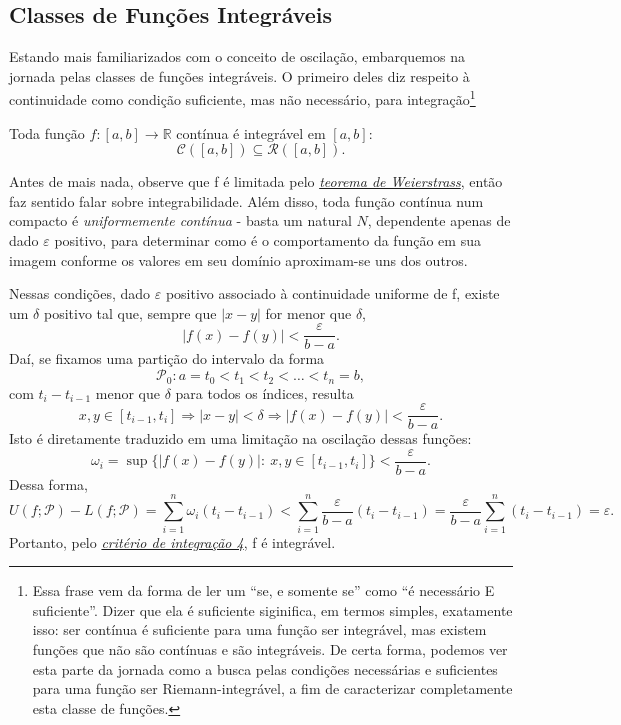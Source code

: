 \documentclass[../analysisII_notes.tex]{subfiles}
\begin{document}
\subsection{Classes de Funções Integráveis}
Estando mais familiarizados com o conceito de oscilação, embarquemos na jornada pelas classes de funções integráveis. O primeiro deles diz respeito à continuidade como condição suficiente, mas não necessário, para integração\footnote{Essa frase vem da forma de ler um ``se, e somente se'' como ``é necessário E suficiente''. Dizer que ela é suficiente siginifica, em termos simples, exatamente isso: ser contínua é suficiente para uma função ser integrável, mas existem funções que não são contínuas e são integráveis. De certa forma, podemos ver esta parte da jornada como a busca pelas condições necessárias e suficientes para uma função ser Riemann-integrável, a fim de caracterizar completamente esta classe de funções.}
\begin{theorem*}
	Toda função \(f:[a, b]\rightarrow \mathbb{R}\) contínua é integrável em \([a, b]\):
	\[
		\mathcal{C}([a, b])\subseteq \mathcal{R}([a, b]).
	\]
\end{theorem*}
\begin{proof*}
	Antes de mais nada, observe que f é limitada pelo \hyperlink{weierstrass_theorem}{\textit{teorema de Weierstrass}}, então faz sentido falar sobre integrabilidade. Além disso, toda função contínua num compacto é \textit{uniformemente contínua} - basta um natural \(N\), dependente apenas de dado \(\varepsilon \) positivo, para determinar como é o comportamento da função em sua imagem conforme os valores em seu domínio aproximam-se uns dos outros.

	Nessas condições, dado \(\varepsilon \) positivo associado à continuidade uniforme de f, existe um \(\delta \) positivo tal que, sempre que \(|x-y|\) for menor que \(\delta \),
	\[
		|f(x)-f(y)|<\frac{\varepsilon }{b-a}.
	\]
	Daí, se fixamos uma partição do intervalo da forma
	\[
		\mathcal{P}_{0}: a = t_{0} < t_{1}<t_2<\dotsc <t_{n}=b,
	\]
	com \(t_{i}-t_{i-1}\) menor que \(\delta \) para todos os índices, resulta
	\[
		x, y\in [t_{i-1}, t_{i}] \Rightarrow |x-y|<\delta  \Rightarrow |f(x)-f(y)|<\frac{\varepsilon }{b-a}.
	\]
	Isto é diretamente traduzido em uma limitação na oscilação dessas funções:
	\[
		\omega_{i}=\sup_{}\{|f(x)-f(y)|:\: x, y\in [t_{i-1}, t_{i}]\} < \frac{\varepsilon }{b-a}.
	\]
	Dessa forma,
	\[
		U(f; \mathcal{P})-L(f; \mathcal{P})=\sum\limits_{i=1}^{n}\omega_{i}(t_{i}-t_{i-1}) < \sum\limits_{i=1}^{n}\frac{\varepsilon }{b-a}(t_{i}-t_{i-1})=\frac{\varepsilon }{b-a}\sum\limits_{i=1}^{n}(t_{i}-t_{i-1})=\varepsilon .
	\]
	Portanto, pelo \hyperlink{integrability_conditions}{\textit{critério de integração 4}}, f é integrável. \qedsymbol
\end{proof*}
\end{document}
